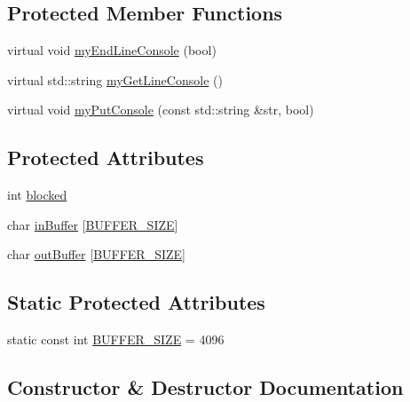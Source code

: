 \subsection*{Protected Member Functions}
\begin{DoxyCompactItemize}
\item 
virtual void \mbox{\hyperlink{classsgl_1_1qtgui_1_1ConsoleStreambufQt_aab6a7af5dac69a7c773d3aae3074696e}{my\+End\+Line\+Console}} (bool)
\item 
virtual std\+::string \mbox{\hyperlink{classsgl_1_1qtgui_1_1ConsoleStreambufQt_ab5fb2275a81dbd1c170c37bc48adf08a}{my\+Get\+Line\+Console}} ()
\item 
virtual void \mbox{\hyperlink{classsgl_1_1qtgui_1_1ConsoleStreambufQt_aa8582bd55e3d7fc8860ca9c87efe3dea}{my\+Put\+Console}} (const std\+::string \&str, bool)
\end{DoxyCompactItemize}
\subsection*{Protected Attributes}
\begin{DoxyCompactItemize}
\item 
int \mbox{\hyperlink{classsgl_1_1ConsoleStreambuf_ac74e3d5a1b1eeb5c8e32867ad62823f0}{blocked}}
\item 
char \mbox{\hyperlink{classsgl_1_1ConsoleStreambuf_a6dfeba2ed7f89c327dd07f6136b2a256}{in\+Buffer}} \mbox{[}\mbox{\hyperlink{classsgl_1_1ConsoleStreambuf_a91f806c1bc7c1f4f402a627773840252}{B\+U\+F\+F\+E\+R\+\_\+\+S\+I\+ZE}}\mbox{]}
\item 
char \mbox{\hyperlink{classsgl_1_1ConsoleStreambuf_a015231cbe2f7737eee637ddee666f1dd}{out\+Buffer}} \mbox{[}\mbox{\hyperlink{classsgl_1_1ConsoleStreambuf_a91f806c1bc7c1f4f402a627773840252}{B\+U\+F\+F\+E\+R\+\_\+\+S\+I\+ZE}}\mbox{]}
\end{DoxyCompactItemize}
\subsection*{Static Protected Attributes}
\begin{DoxyCompactItemize}
\item 
static const int \mbox{\hyperlink{classsgl_1_1ConsoleStreambuf_a91f806c1bc7c1f4f402a627773840252}{B\+U\+F\+F\+E\+R\+\_\+\+S\+I\+ZE}} = 4096
\end{DoxyCompactItemize}


\subsection{Constructor \& Destructor Documentation}
\mbox{\label{classsgl_1_1qtgui_1_1ConsoleStreambufQt_a98660042e1f344d995a0e2e80daee3e9}} 
